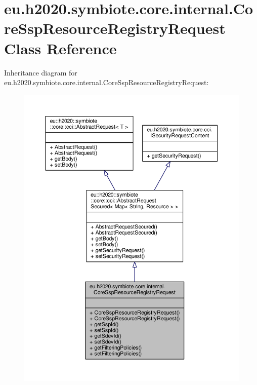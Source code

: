 \hypertarget{classeu_1_1h2020_1_1symbiote_1_1core_1_1internal_1_1CoreSspResourceRegistryRequest}{}\section{eu.\+h2020.\+symbiote.\+core.\+internal.\+Core\+Ssp\+Resource\+Registry\+Request Class Reference}
\label{classeu_1_1h2020_1_1symbiote_1_1core_1_1internal_1_1CoreSspResourceRegistryRequest}


Inheritance diagram for eu.\+h2020.\+symbiote.\+core.\+internal.\+Core\+Ssp\+Resource\+Registry\+Request\+:
\nopagebreak
\begin{figure}[H]
\begin{center}
\leavevmode
\includegraphics[width=350pt]{classeu_1_1h2020_1_1symbiote_1_1core_1_1internal_1_1CoreSspResourceRegistryRequest__inherit__graph}
\end{center}
\end{figure}


